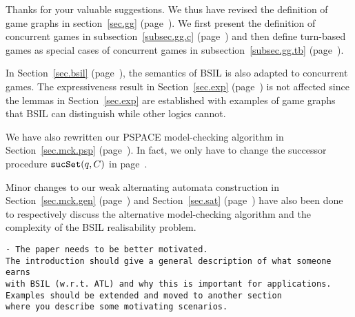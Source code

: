 \documentclass[11pt]{article}
\newcommand{\ttsynsuc}{\mbox{\tt sucSet}}
\newcounter{cabbage1}
\newcounter{cabbage2}
\newcounter{cabbage3}
\newcounter{bean1}
\newcounter{bean2}
\newcounter{bean3}
\newcounter{bean4}
\newcounter{bean5}
\newcounter{bean6}
\newenvironment{reply2}{\begin{list}{\bf (Reply 2.\arabic{bean2}):} 
        {\usecounter{bean2}\setcounter{bean2}{\value{cabbage2}} 
        \item \setcounter{cabbage2}{\value{bean2}} 
        }
}{\end{list}}
\begin{document}
\begin{reply2} 
Thanks for your valuable suggestions. 
We thus have revised the definition of game graphs in 
section~\ref{sec.gg} (page~\pageref{sec.gg}).  
We first present the definition of concurrent games 
in subsection~\ref{subsec.gg.c}  (page~\pageref{subsec.gg.c})
and then define turn-based games as special cases of concurrent games 
in subsection~\ref{subsec.gg.tb} (page~\pageref{subsec.gg.tb}).  

In Section~\ref{sec.bsil} (page~\pageref{sec.bsil}), 
the semantics of BSIL is also adapted to concurrent games.   
The expressiveness result in Section~\ref{sec.exp} (page~\pageref{sec.exp}) is not affected 
since the lemmas in Section~\ref{sec.exp} are established 
with examples of game graphs that BSIL can distinguish while 
other logics cannot. 

We have also rewritten our PSPACE model-checking algorithm 
in Section~\ref{sec.mck.psp} (page~\pageref{sec.mck.psp}). 
In fact, we only have to change the successor procedure 
$\ttsynsuc(q,C)$ in 
page~\pageref{tab.nd.suc}.  

Minor changes to our weak alternating automata construction 
in Section~\ref{sec.mck.gen} (page~\pageref{sec.mck.gen}) and 
Section~\ref{sec.sat} (page~\pageref{sec.sat})
have also been done 
to respectively discuss the alternative model-checking algorithm 
and the complexity of the BSIL realisability problem.  
\end{reply2} 
\begin{verbatim} 
- The paper needs to be better motivated. 
The introduction should give a general description of what someone earns 
with BSIL (w.r.t. ATL) and why this is important for applications. 
Examples should be extended and moved to another section 
where you describe some motivating scenarios. 
\end{verbatim} 
\end{document}
